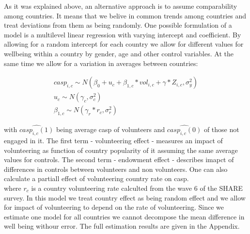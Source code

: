 \documentclass[10pt, letterpaper]{article}
\begin{document}
\begin{spacing}{1.4}
As it was explained above, an alternative approach is to assume comparability among countries. It means that we belive in common trends among countries and treat deviations from them as being randomly. One possible formulation of a model is a multilevel linear regression with varying intercept and coefficient. By allowing for a random intercept for each country we allow for different values for wellbeing within a country by gender, age and other control variables. At the same time we allow for a variation in averages between countries:


 \begin{eqnarray}
	casp_{i,c}\sim N(\beta_{0}+ u_{c} +  \beta_{1,c} * vol_{i,c}+\gamma*Z_{i,c},\sigma^{2}_{y}) \\	
	u_{c} \sim N(\gamma_{c},\sigma^{2}_{c}) \\
	\beta_{1,c} \sim N(\gamma_{r}*r_{c},\sigma^{2}_{r})
 \end{eqnarray}
       
with $\hat{casp_{i,c}(1)}$ being average casp of volunteers and $  \hat{casp_{i,c}(0)}$ of those not engaged in it. The first term - volunteering effect - measures an impact of volunteering as function of country popularity of it assuming the same average values for controls. The second term - endowment effect - describes imapct of differences in controls between volunteers and non volunteers. One can also calculate a partiall effect of volunteering country rate on casp.  \\   
 
where $r_{c}$ is a country volunteering rate calculted from the wave 6 of the SHARE survey. In this model we treat country effect as being random effect and we allow for impact of volunteering to depend on the rate of volunteering. Since we estimate one model for all countries we cannot decompose the mean difference in well being withour error. The full estimation results are given in the Appendix. 



\end{spacing}
\end{document}
